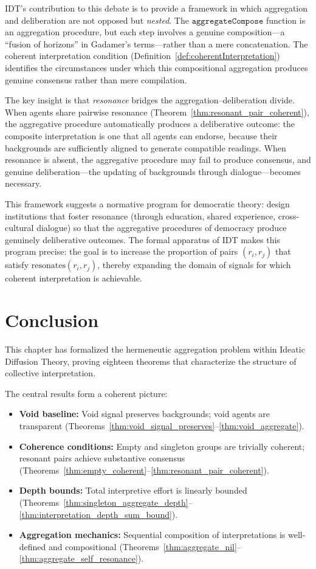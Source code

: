 IDT's contribution to this debate is to provide a framework in which
aggregation and deliberation are not opposed but \emph{nested}.  The
$\texttt{aggregateCompose}$ function is an aggregation procedure, but each
step involves a genuine composition---a ``fusion of horizons'' in Gadamer's
terms---rather than a mere concatenation.  The coherent interpretation
condition (Definition~\ref{def:coherentInterpretation}) identifies the
circumstances under which this compositional aggregation produces genuine
consensus rather than mere compilation.

The key insight is that \emph{resonance} bridges the aggregation--deliberation
divide.  When agents share pairwise resonance
(Theorem~\ref{thm:resonant_pair_coherent}), the aggregative procedure
automatically produces a deliberative outcome: the composite interpretation
is one that all agents can endorse, because their backgrounds are
sufficiently aligned to generate compatible readings.  When resonance is
absent, the aggregative procedure may fail to produce consensus, and
genuine deliberation---the updating of backgrounds through dialogue---becomes
necessary.

This framework suggests a normative program for democratic theory: design
institutions that foster resonance (through education, shared experience,
cross-cultural dialogue) so that the aggregative procedures of democracy
produce genuinely deliberative outcomes.  The formal apparatus of IDT
makes this program precise: the goal is to increase the proportion of
pairs $(r_i, r_j)$ that satisfy $\text{resonates}(r_i, r_j)$, thereby
expanding the domain of signals for which coherent interpretation is
achievable.

\section{Conclusion}
\label{sec:ch19-concl}

This chapter has formalized the hermeneutic aggregation problem within
Ideatic Diffusion Theory, proving eighteen theorems that characterize the
structure of collective interpretation.

The central results form a coherent picture:
\begin{itemize}
  \item \textbf{Void baseline:} Void signal preserves backgrounds; void
    agents are transparent (Theorems~\ref{thm:void_signal_preserves}--\ref{thm:void_aggregate}).
  \item \textbf{Coherence conditions:} Empty and singleton groups are
    trivially coherent; resonant pairs achieve substantive consensus
    (Theorems~\ref{thm:empty_coherent}--\ref{thm:resonant_pair_coherent}).
  \item \textbf{Depth bounds:} Total interpretive effort is linearly bounded
    (Theorems~\ref{thm:singleton_aggregate_depth}--\ref{thm:interpretation_depth_sum_bound}).
  \item \textbf{Aggregation mechanics:} Sequential composition of
    interpretations is well-defined and compositional
    (Theorems~\ref{thm:aggregate_nil}--\ref{thm:aggregate_self_resonance}).
\end{itemize}

